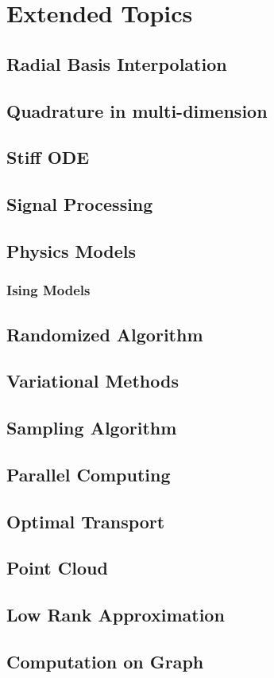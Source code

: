 \chapter{Extended Topics}

\section{Radial Basis Interpolation}

\section{Quadrature in multi-dimension}

\section{Stiff ODE}
\section{Signal Processing}
\section{Physics Models}
\subsection{Ising Models}

\section{Randomized Algorithm}

\section{Variational Methods}

\section{Sampling Algorithm}

\section{Parallel Computing}



\section{Optimal Transport}
\newpage
\section{Point Cloud}



\section{Low Rank Approximation}


\section{Computation on Graph}

